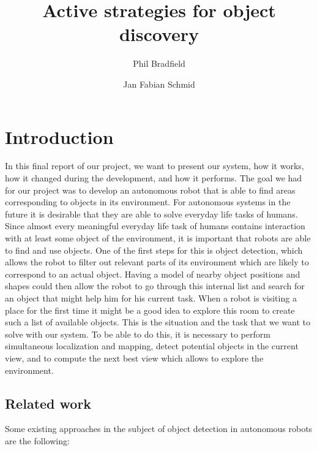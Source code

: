 \documentclass[a4paper,11pt,english]{article}
\begin{document}
\title{Active strategies for object discovery}
\author{Phil Bradfield \and Jan Fabian Schmid}
	
\maketitle 

\section{Introduction}

In this final report of our project, we want to present our system, how it works, how it changed during the development, and how it performs.
The goal we had for our project was to develop an autonomous robot that is able to find areas corresponding to objects in its environment.
For autonomous systems in the future it is desirable that they are able to solve everyday life tasks of humans.
Since almost every meaningful everyday life task of humans contains interaction with at least some object of the environment, it is important that robots are able to find and use objects.
One of the first steps for this is object detection, which allows the robot to filter out relevant parts of its environment which are likely to correspond to an actual object. Having a model of nearby object positions and shapes could then allow the robot to go through this internal list and search for an object that might help him for his current task.
When a robot is visiting a place for the first time it might be a good idea to explore this room to create such a list of available objects.
This is the situation and the task that we want to solve with our system.
To be able to do this, it is necessary to perform simultaneous localization and mapping, detect potential objects in the current view, and to compute the next best view which allows to explore the environment.

\subsection{Related work}
Some existing approaches in the subject of object detection in autonomous robots are the following:
\end{document}

